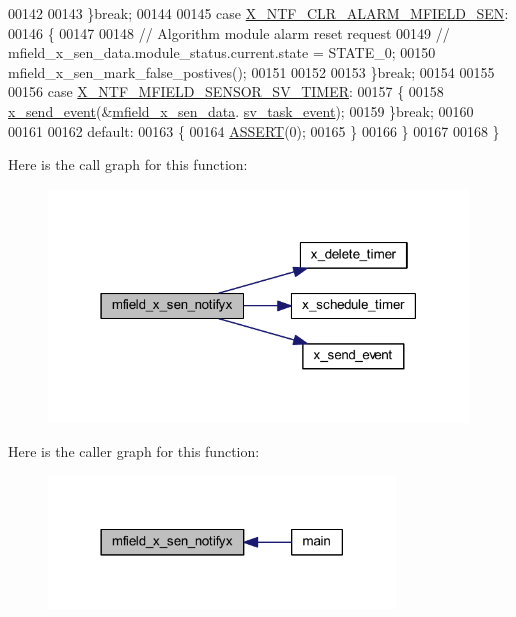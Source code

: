 \begin{DoxyCode}
00142 
00143         \}\textcolor{keywordflow}{break};
00144 
00145          \textcolor{keywordflow}{case} \hyperlink{a00021_af3da43bd9d885f9c2a69ece8f997891b}{X\_NTF\_CLR\_ALARM\_MFIELD\_SEN}:
00146         \{
00147 
00148            \textcolor{comment}{// Algorithm module alarm reset request}
00149            \textcolor{comment}{//  mfield\_x\_sen\_data.module\_status.current.state = STATE\_0;}
00150              mfield\_x\_sen\_mark\_false\_postives();
00151 
00152 
00153         \}\textcolor{keywordflow}{break};
00154 
00155 
00156         \textcolor{keywordflow}{case} \hyperlink{a00025_ad9eede821e7c65d58f1806af4bd6bf29}{X\_NTF\_MFIELD\_SENSOR\_SV\_TIMER}:
00157         \{
00158            \hyperlink{a00036_a4bc3d03c8d62c8237329ed4e969fbc1b}{x\_send\_event}(&\hyperlink{a00050_af8c531b1ba5fea148fb9111e06058f92}{mfield\_x\_sen\_data}.
      \hyperlink{a00025_a43c345f39ea3aefbb60ef1ef57fe5d83}{sv\_task\_event});
00159         \}\textcolor{keywordflow}{break};
00160 
00161 
00162         \textcolor{keywordflow}{default}:
00163         \{
00164             \hyperlink{a00072_abb8ff8e213ac9f6fb21d2b968583b936}{ASSERT}(0);
00165         \}
00166     \}
00167 
00168 \}
\end{DoxyCode}


Here is the call graph for this function\+:\nopagebreak
\begin{figure}[H]
\begin{center}
\leavevmode
\includegraphics[width=316pt]{dd/da2/a00019_ac28a2b5f3fa92c0593446e15a63a501c_cgraph}
\end{center}
\end{figure}




Here is the caller graph for this function\+:\nopagebreak
\begin{figure}[H]
\begin{center}
\leavevmode
\includegraphics[width=261pt]{dd/da2/a00019_ac28a2b5f3fa92c0593446e15a63a501c_icgraph}
\end{center}
\end{figure}



